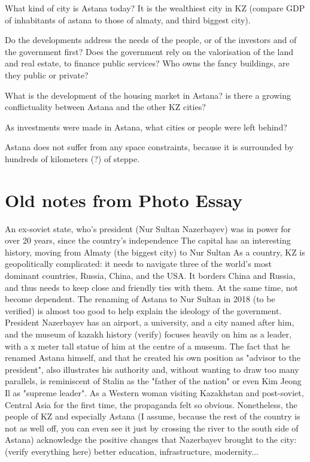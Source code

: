 \documentclass{article}
\begin{document}
What kind of city is Astana today? It is the wealthiest city in KZ (compare GDP of inhabitants of astana to those of almaty, and third biggest city). 

Do the developments address the needs of the people, or of the investors and of the government first?
Does the government rely on the valorisation of the land and real estate, to finance public services? Who owns the fancy buildings, are they public or private?

What is the development of the housing market in Astana?
is there a growing conflictuality between Astana and the other KZ cities?

As investments were made in Astana, what cities or people were left behind?

Astana does not suffer from any space constraints, because it is surrounded by hundreds of kilometers (?) of steppe. 



\section{Old notes from Photo Essay}

An ex-soviet state, who's president (Nur Sultan Nazerbayev) was in power for over 20 years, since the country's independence
The capital has an interesting history, moving from Almaty (the biggest city) to Nur Sultan
As a country, KZ is geopolitically complicated: it needs to navigate three of the world's most dominant countries, Russia, China, and the USA. It borders China and Russia, and thus needs to keep close and friendly ties with them. At the same time, not become dependent.
The renaming of Astana to Nur Sultan in 2018 (to be verified) is almost too good to help explain the ideology of the government. President Nazerbayev has an airport, a university, and a city named after him, and the museum of kazakh history (verify) focuses heavily on him as a leader, with a x meter tall statue of him at the centre of a museum.
 The fact that he renamed Astana himself, and that he created his own position as "advisor to the president", also illustrates his authority and, without wanting to draw too many parallels, is reminiscent of Stalin as the "father of the nation" or even Kim Jeong Il as "supreme leader". 
 As a Western woman visiting Kazakhstan and post-soviet, Central Asia for the first time, the propaganda felt so obvious.
 Nonetheless, the people of KZ and especially Astana (I assume, because the rest of the country is not as well off, you can even see it just by crossing the river to the south side of Astana) acknowledge the positive changes that Nazerbayev brought to the city: (verify everything here) better education, infrastructure, modernity...
 
\end{document}
